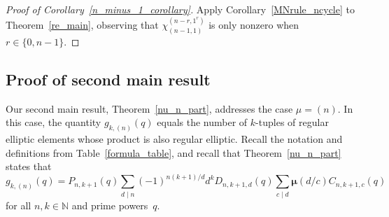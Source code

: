 \documentclass[Unicode,ALCO]{cedram}
\newcommand{\N}{\mathbb{N}}
\newcommand{\moebius}{\pmb{\mu}}
\begin{document}
\begin{proof}[Proof of Corollary~\ref{n_minus_1_corollary}]
Apply Corollary~\ref{MNrule_ncycle} to Theorem~\ref{re_main},
observing that \(\chi^{(n-r,1^r)}_{(n-1,1)}\) is only nonzero when \(r \in \{0,n-1\}\).
\end{proof}





























\subsection{Proof of second main result}
\label{nu_equals_n_section}

Our second main result, Theorem~\ref{nu_n_part}, addresses the case \(\mu = (n)\).
In this case, the quantity \(g_{k,(n)} (q)\) equals the number of \(k\)-tuples of regular elliptic elements whose product is also regular elliptic.
Recall the notation and definitions from Table~\ref{formula_table}, and recall that Theorem~\ref{nu_n_part} states that
\begin{equation}
g_{k,(n)}(q) = P_{n,k+1} (q)
\sum_{d \mid n}
(-1)^{n(k+1)/d}
d^{k}
D_{n,k+1,d} (q)
\sum_{c \mid d}
\moebius(d/c)
C_{n,k+1,c} (q)
\end{equation}
for all \(n, k \in \N\) and prime powers~\(q\).
\end{document}
